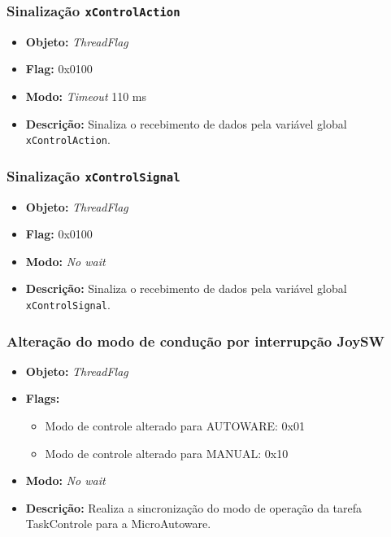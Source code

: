 \subsubsection*{Sinalização \texttt{xControlAction}}
	
	\begin{itemize}
		\item \textbf{Objeto:} \textit{ThreadFlag}
		\item \textbf{Flag:} 0x0100
		\item \textbf{Modo:} \textit{Timeout} 110 ms
		\item \textbf{Descrição:} Sinaliza o recebimento de dados pela variável global \texttt{xControlAction}.
		
	\end{itemize}	

\subsubsection*{Sinalização \texttt{xControlSignal}}
	
	\begin{itemize}
		\item \textbf{Objeto:} \textit{ThreadFlag}
		\item \textbf{Flag:} 0x0100
		\item \textbf{Modo:} \textit{No wait}
		\item \textbf{Descrição:} Sinaliza o recebimento de dados pela variável global \texttt{xControlSignal}.
		
	\end{itemize}	



\subsubsection*{Alteração do modo de condução por interrupção JoySW}
	
	\begin{itemize}
		\item \textbf{Objeto:} \textit{ThreadFlag}
		\item \textbf{Flags:}
		\begin{itemize}
			\item Modo de controle alterado para AUTOWARE: 0x01
			\item Modo de controle alterado para MANUAL: 0x10
			
		\end{itemize}
		\item \textbf{Modo:} \textit{No wait}
		\item \textbf{Descrição:} Realiza a sincronização do modo de operação da tarefa TaskControle para a MicroAutoware.
		
	\end{itemize}

